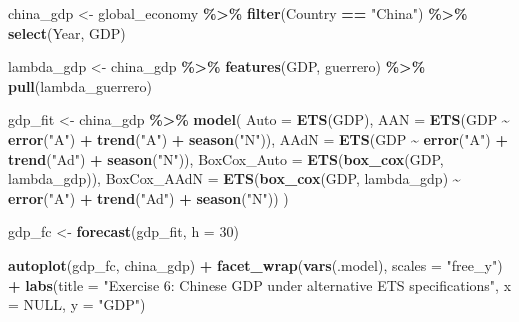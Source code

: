 \documentclass[
  11pt,
]{article}
\newenvironment{Shaded}{\begin{snugshade}}{\end{snugshade}}
\newcommand{\AttributeTok}[1]{\textcolor[rgb]{0.13,0.29,0.53}{#1}}
\newcommand{\ConstantTok}[1]{\textcolor[rgb]{0.56,0.35,0.01}{#1}}
\newcommand{\DecValTok}[1]{\textcolor[rgb]{0.00,0.00,0.81}{#1}}
\newcommand{\FunctionTok}[1]{\textcolor[rgb]{0.13,0.29,0.53}{\textbf{#1}}}
\newcommand{\NormalTok}[1]{#1}
\newcommand{\OtherTok}[1]{\textcolor[rgb]{0.56,0.35,0.01}{#1}}
\newcommand{\SpecialCharTok}[1]{\textcolor[rgb]{0.81,0.36,0.00}{\textbf{#1}}}
\newcommand{\StringTok}[1]{\textcolor[rgb]{0.31,0.60,0.02}{#1}}
\begin{document}
\begin{Shaded}
\begin{Highlighting}[]
\NormalTok{china\_gdp }\OtherTok{\textless{}{-}}\NormalTok{ global\_economy }\SpecialCharTok{\%\textgreater{}\%}
  \FunctionTok{filter}\NormalTok{(Country }\SpecialCharTok{==} \StringTok{"China"}\NormalTok{) }\SpecialCharTok{\%\textgreater{}\%}
  \FunctionTok{select}\NormalTok{(Year, GDP)}

\NormalTok{lambda\_gdp }\OtherTok{\textless{}{-}}\NormalTok{ china\_gdp }\SpecialCharTok{\%\textgreater{}\%} \FunctionTok{features}\NormalTok{(GDP, guerrero) }\SpecialCharTok{\%\textgreater{}\%} \FunctionTok{pull}\NormalTok{(lambda\_guerrero)}

\NormalTok{gdp\_fit }\OtherTok{\textless{}{-}}\NormalTok{ china\_gdp }\SpecialCharTok{\%\textgreater{}\%}
  \FunctionTok{model}\NormalTok{(}
    \AttributeTok{Auto =} \FunctionTok{ETS}\NormalTok{(GDP),}
    \AttributeTok{AAN =} \FunctionTok{ETS}\NormalTok{(GDP }\SpecialCharTok{\textasciitilde{}} \FunctionTok{error}\NormalTok{(}\StringTok{"A"}\NormalTok{) }\SpecialCharTok{+} \FunctionTok{trend}\NormalTok{(}\StringTok{"A"}\NormalTok{) }\SpecialCharTok{+} \FunctionTok{season}\NormalTok{(}\StringTok{"N"}\NormalTok{)),}
    \AttributeTok{AAdN =} \FunctionTok{ETS}\NormalTok{(GDP }\SpecialCharTok{\textasciitilde{}} \FunctionTok{error}\NormalTok{(}\StringTok{"A"}\NormalTok{) }\SpecialCharTok{+} \FunctionTok{trend}\NormalTok{(}\StringTok{"Ad"}\NormalTok{) }\SpecialCharTok{+} \FunctionTok{season}\NormalTok{(}\StringTok{"N"}\NormalTok{)),}
    \AttributeTok{BoxCox\_Auto =} \FunctionTok{ETS}\NormalTok{(}\FunctionTok{box\_cox}\NormalTok{(GDP, lambda\_gdp)),}
    \AttributeTok{BoxCox\_AAdN =} \FunctionTok{ETS}\NormalTok{(}\FunctionTok{box\_cox}\NormalTok{(GDP, lambda\_gdp) }\SpecialCharTok{\textasciitilde{}} \FunctionTok{error}\NormalTok{(}\StringTok{"A"}\NormalTok{) }\SpecialCharTok{+} \FunctionTok{trend}\NormalTok{(}\StringTok{"Ad"}\NormalTok{) }\SpecialCharTok{+} \FunctionTok{season}\NormalTok{(}\StringTok{"N"}\NormalTok{))}
\NormalTok{  )}

\NormalTok{gdp\_fc }\OtherTok{\textless{}{-}} \FunctionTok{forecast}\NormalTok{(gdp\_fit, }\AttributeTok{h =} \DecValTok{30}\NormalTok{)}

\FunctionTok{autoplot}\NormalTok{(gdp\_fc, china\_gdp) }\SpecialCharTok{+}
  \FunctionTok{facet\_wrap}\NormalTok{(}\FunctionTok{vars}\NormalTok{(.model), }\AttributeTok{scales =} \StringTok{"free\_y"}\NormalTok{) }\SpecialCharTok{+}
  \FunctionTok{labs}\NormalTok{(}\AttributeTok{title =} \StringTok{"Exercise 6: Chinese GDP under alternative ETS specifications"}\NormalTok{, }\AttributeTok{x =} \ConstantTok{NULL}\NormalTok{, }\AttributeTok{y =} \StringTok{"GDP"}\NormalTok{)}
\end{Highlighting}
\end{Shaded}
\end{document}
